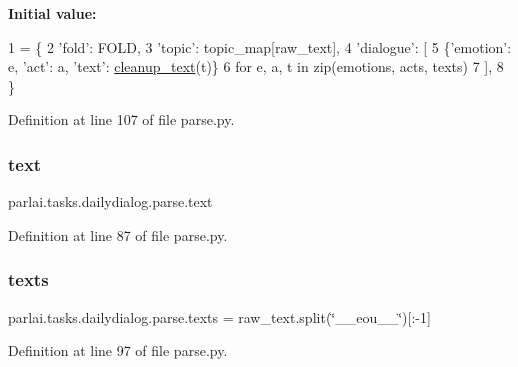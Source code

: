 {\bfseries Initial value\+:}
\begin{DoxyCode}
1 =  \{
2         \textcolor{stringliteral}{'fold'}: FOLD,
3         \textcolor{stringliteral}{'topic'}: topic\_map[raw\_text],
4         \textcolor{stringliteral}{'dialogue'}: [
5             \{\textcolor{stringliteral}{'emotion'}: e, \textcolor{stringliteral}{'act'}: a, \textcolor{stringliteral}{'text'}: \hyperlink{namespaceparlai_1_1tasks_1_1dailydialog_1_1parse_a9bee736957d0b4eb0a046855faa821dc}{cleanup\_text}(t)\}
6             \textcolor{keywordflow}{for} e, a, t \textcolor{keywordflow}{in} zip(emotions, acts, texts)
7         ],
8     \}
\end{DoxyCode}


Definition at line 107 of file parse.\+py.

\mbox{\label{namespaceparlai_1_1tasks_1_1dailydialog_1_1parse_ad0b494b4bb78b7da65dba688516fd065}} 
\subsubsection{\texorpdfstring{text}{text}}
{\footnotesize\ttfamily parlai.\+tasks.\+dailydialog.\+parse.\+text}



Definition at line 87 of file parse.\+py.

\mbox{\label{namespaceparlai_1_1tasks_1_1dailydialog_1_1parse_ad9c36b3a53f03612c29b79525a210c75}} 
\subsubsection{\texorpdfstring{texts}{texts}}
{\footnotesize\ttfamily parlai.\+tasks.\+dailydialog.\+parse.\+texts = raw\+\_\+text.\+split(\char`\"{}\+\_\+\+\_\+eou\+\_\+\+\_\+\char`\"{})\mbox{[}\+:-\/1\mbox{]}}



Definition at line 97 of file parse.\+py.

\mbox{\label{namespaceparlai_1_1tasks_1_1dailydialog_1_1parse_a50ad2692c4cc4e33f1a5303dc3394ebe}} 
